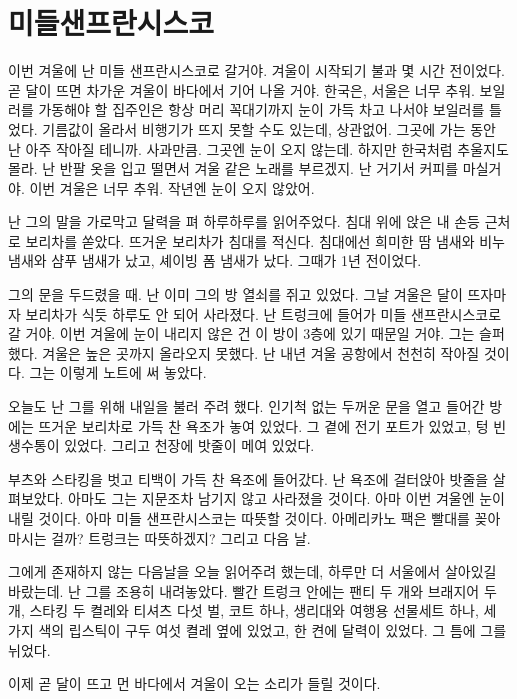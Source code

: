 \documentclass[12pt, b6paper, openany]{memoir}
\newenvironment{article}{}{}
\begin{document}
\begin{article}
\hypertarget{uxbbf8uxb4e4uxc0ccuxd504uxb780uxc2dcuxc2a4uxcf54}{%
\chapter{미들샌프란시스코}\label{uxbbf8uxb4e4uxc0ccuxd504uxb780uxc2dcuxc2a4uxcf54}}

이번 겨울에 난 미들 샌프란시스코로 갈거야. 겨울이 시작되기 불과 몇 시간 전이었다. 곧 달이 뜨면 차가운 겨울이 바다에서 기어 나올 거야. 한국은, 서울은 너무 추워. 보일러를 가동해야 할 집주인은 항상 머리 꼭대기까지 눈이 가득 차고 나서야 보일러를 틀었다. 기름값이 올라서 비행기가 뜨지 못할 수도 있는데, 상관없어. 그곳에 가는 동안 난 아주 작아질 테니까. 사과만큼. 그곳엔 눈이 오지 않는데. 하지만 한국처럼 추울지도 몰라. 난 반팔 옷을 입고 떨면서 겨울 같은 노래를 부르겠지. 난 거기서 커피를 마실거야. 이번 겨울은 너무 추워. 작년엔 눈이 오지 않았어.

난 그의 말을 가로막고 달력을 펴 하루하루를 읽어주었다. 침대 위에 앉은 내 손등 근처로 보리차를 쏟았다. 뜨거운 보리차가 침대를 적신다. 침대에선 희미한 땀 냄새와 비누 냄새와 샴푸 냄새가 났고, 셰이빙 폼 냄새가 났다. 그때가 1년 전이었다.

그의 문을 두드렸을 때. 난 이미 그의 방 열쇠를 쥐고 있었다. 그날 겨울은 달이 뜨자마자 보리차가 식듯 하루도 안 되어 사라졌다. 난 트렁크에 들어가 미들 샌프란시스코로 갈 거야. 이번 겨울에 눈이 내리지 않은 건 이 방이 3층에 있기 때문일 거야. 그는 슬퍼했다. 겨울은 높은 곳까지 올라오지 못했다. 난 내년 겨울 공항에서 천천히 작아질 것이다. 그는 이렇게 노트에 써 놓았다.

오늘도 난 그를 위해 내일을 불러 주려 했다. 인기척 없는 두꺼운 문을 열고 들어간 방에는 뜨거운 보리차로 가득 찬 욕조가 놓여 있었다. 그 곁에 전기 포트가 있었고, 텅 빈 생수통이 있었다. 그리고 천장에 밧줄이 메여 있었다.

부츠와 스타킹을 벗고 티백이 가득 찬 욕조에 들어갔다. 난 욕조에 걸터앉아 밧줄을 살펴보았다. 아마도 그는 지문조차 남기지 않고 사라졌을 것이다. 아마 이번 겨울엔 눈이 내릴 것이다. 아마 미들 샌프란시스코는 따뜻할 것이다. 아메리카노 팩은 빨대를 꽂아 마시는 걸까? 트렁크는 따뜻하겠지? 그리고 다음 날.

그에게 존재하지 않는 다음날을 오늘 읽어주려 했는데, 하루만 더 서울에서 살아있길 바랐는데. 난 그를 조용히 내려놓았다. 빨간 트렁크 안에는 팬티 두 개와 브래지어 두 개, 스타킹 두 켤레와 티셔츠 다섯 벌, 코트 하나, 생리대와 여행용 선물세트 하나, 세 가지 색의 립스틱이 구두 여섯 켤레 옆에 있었고, 한 켠에 달력이 있었다. 그 틈에 그를 뉘었다.

이제 곧 달이 뜨고 먼 바다에서 겨울이 오는 소리가 들릴 것이다.
\newpage\null\thispagestyle{empty}\newpage
\end{article}
\end{document}
